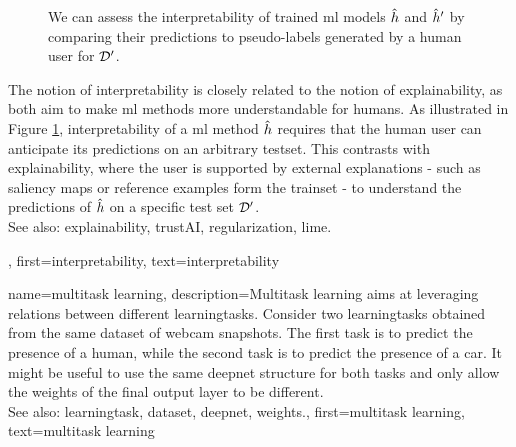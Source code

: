 {{\begin{figure}
\begin{center}
 		\caption{We can assess the interpretability of trained \gls{ml} \glspl{model} 
 		$\hat{h}$ and $\hat{h}'$ by comparing their \glspl{prediction} 
		to pseudo-\glspl{label} generated by a human user for $\mathcal{D}'$. 
		\label{fig_aug_simulatability_dict}}
 		\end{center}
	 \end{figure} 
 	 The notion of interpretability is closely related to the notion of explainability, 
 	 as both aim to make \gls{ml} methods more understandable for humans. 
	 As illustrated in Figure \ref{fig_aug_simulatability_dict}, interpretability of a \gls{ml} 
	 method $\hat{h}$ requires that the human user can anticipate its \glspl{prediction} 
	 on an arbitrary \gls{testset}. This contrasts with explainability, where the user is supported by 
	 external explanations - such as saliency maps or reference examples form the \gls{trainset} - 
	 to understand the predictions of $\hat{h}$ on a specific test set $\mathcal{D}'$. \\ 
	 See also: \gls{explainability}, \gls{trustAI}, \gls{regularization}, \gls{lime}.
},
 	first={interpretability},
 	text={interpretability}
 }

{name={multitask learning},
	description={Multitask learning aims at leveraging relations between 
	 	different \glspl{learningtask}. Consider two \glspl{learningtask} obtained from the 
	 	same \gls{dataset} of webcam snapshots. The first task is to predict the presence 
	 	of a human, while the second task is to predict the presence of a car. It might be useful 
	 	to use the same \gls{deepnet} structure for both tasks and only allow the \gls{weights} of 
	 	the final output layer to be different.
	 			\\ 
		See also: \gls{learningtask}, \gls{dataset}, \gls{deepnet}, \gls{weights}.},
	first={multitask learning},
	text={multitask learning}
}

